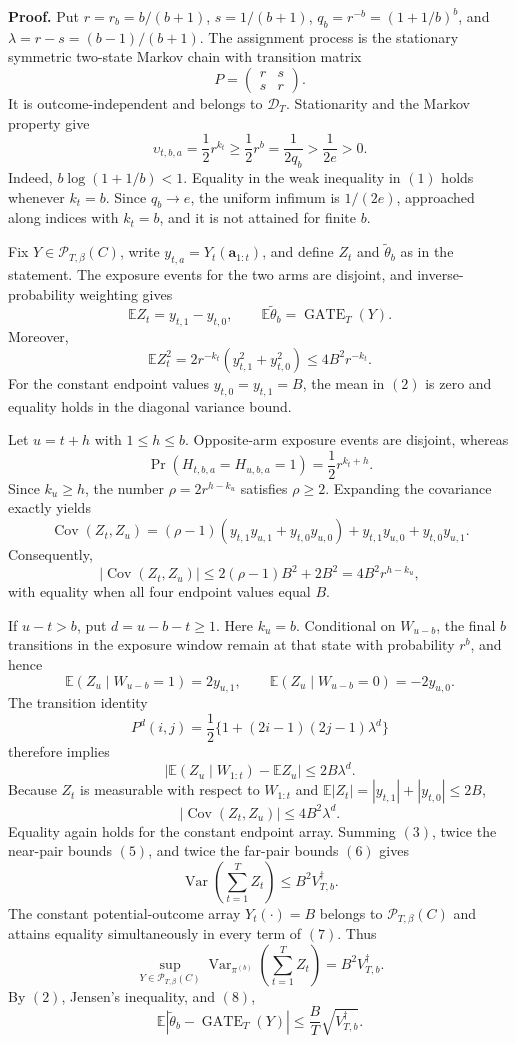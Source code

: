 \textbf{Proof.} Put \(r=r_b=b/(b+1)\), \(s=1/(b+1)\), \(q_b=r^{-b}=(1+1/b)^b\), and \(\lambda=r-s=(b-1)/(b+1)\). The assignment process is the stationary symmetric two-state Markov chain with transition matrix
\[
P=\begin{pmatrix}r&s\\s&r\end{pmatrix}.
\]
It is outcome-independent and belongs to \(\mathcal D_T\). Stationarity and the Markov property give
\[
\upsilon_{t,b,a}=\frac12r^{k_t}\ge\frac12r^b=\frac{1}{2q_b}>\frac{1}{2e}>0.
\tag{1}
\]
Indeed, \(b\log(1+1/b)<1\). Equality in the weak inequality in \((1)\) holds whenever \(k_t=b\). Since \(q_b\to e\), the uniform infimum is \(1/(2e)\), approached along indices with \(k_t=b\), and it is not attained for finite \(b\).

Fix \(Y\in\mathcal P_{T,\beta}(C)\), write \(y_{t,a}=Y_t(\mathbf a_{1:t})\), and define \(Z_t\) and \(\widetilde\theta_b\) as in the statement. The exposure events for the two arms are disjoint, and inverse-probability weighting gives
\[
\mathbb EZ_t=y_{t,1}-y_{t,0},\qquad \mathbb E\widetilde\theta_b=\operatorname{GATE}_T(Y).
\tag{2}
\]
Moreover,
\[
\mathbb EZ_t^2=2r^{-k_t}(y_{t,1}^2+y_{t,0}^2)\le4B^2r^{-k_t}.
\tag{3}
\]
For the constant endpoint values \(y_{t,0}=y_{t,1}=B\), the mean in \((2)\) is zero and equality holds in the diagonal variance bound.

Let \(u=t+h\) with \(1\le h\le b\). Opposite-arm exposure events are disjoint, whereas
\[
\Pr(H_{t,b,a}=H_{u,b,a}=1)=\frac12r^{k_t+h}.
\]
Since \(k_u\ge h\), the number \(\rho=2r^{h-k_u}\) satisfies \(\rho\ge2\). Expanding the covariance exactly yields
\[
\operatorname{Cov}(Z_t,Z_u)=(\rho-1)(y_{t,1}y_{u,1}+y_{t,0}y_{u,0})+y_{t,1}y_{u,0}+y_{t,0}y_{u,1}.
\tag{4}
\]
Consequently,
\[
|\operatorname{Cov}(Z_t,Z_u)|\le2(\rho-1)B^2+2B^2=4B^2r^{h-k_u},
\tag{5}
\]
with equality when all four endpoint values equal \(B\).

If \(u-t>b\), put \(d=u-b-t\ge1\). Here \(k_u=b\). Conditional on \(W_{u-b}\), the final \(b\) transitions in the exposure window remain at that state with probability \(r^b\), and hence
\[
\mathbb E(Z_u\mid W_{u-b}=1)=2y_{u,1},\qquad \mathbb E(Z_u\mid W_{u-b}=0)=-2y_{u,0}.
\]
The transition identity
\[
P^d(i,j)=\frac12\{1+(2i-1)(2j-1)\lambda^d\}
\]
therefore implies
\[
\left|\mathbb E(Z_u\mid W_{1:t})-\mathbb EZ_u\right|\le2B\lambda^d.
\]
Because \(Z_t\) is measurable with respect to \(W_{1:t}\) and \(\mathbb E|Z_t|=|y_{t,1}|+|y_{t,0}|\le2B\),
\[
|\operatorname{Cov}(Z_t,Z_u)|\le4B^2\lambda^d.
\tag{6}
\]
Equality again holds for the constant endpoint array. Summing \((3)\), twice the near-pair bounds \((5)\), and twice the far-pair bounds \((6)\) gives
\[
\operatorname{Var}\!\left(\sum_{t=1}^TZ_t\right)\le B^2V_{T,b}^{\dagger}.
\tag{7}
\]
The constant potential-outcome array \(Y_t(\cdot)=B\) belongs to \(\mathcal P_{T,\beta}(C)\) and attains equality simultaneously in every term of \((7)\). Thus
\[
\sup_{Y\in\mathcal P_{T,\beta}(C)}\operatorname{Var}_{\pi^{(b)}}\!\left(\sum_{t=1}^TZ_t\right)=B^2V_{T,b}^{\dagger}.
\tag{8}
\]
By \((2)\), Jensen's inequality, and \((8)\),
\[
\mathbb E|\widetilde\theta_b-\operatorname{GATE}_T(Y)|\le\frac BT\sqrt{V_{T,b}^{\dagger}}.
\tag{9}
\]

